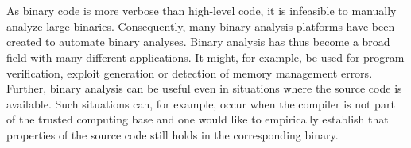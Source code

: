 \documentclass{kththesis}
\begin{document}
\\ \\
As binary code is more verbose than high-level code, it is infeasible to manually analyze large binaries. Consequently, many binary analysis platforms have been created to automate binary analyses\cite{BitBlaze}\cite{BAP}\cite{TrABin}\cite{CodeSurfer}. Binary analysis has thus become a broad field with many different applications. It might, for example, be used for program verification\cite{TrABin}, exploit generation\cite{angr} or detection of memory management errors\cite{valgrind}. Further, binary analysis can be useful even in situations where the source code is available. Such situations can, for example, occur when the compiler is not part of the trusted computing base and one would like to empirically establish that properties of the source code still holds in the corresponding binary.
\end{document}
